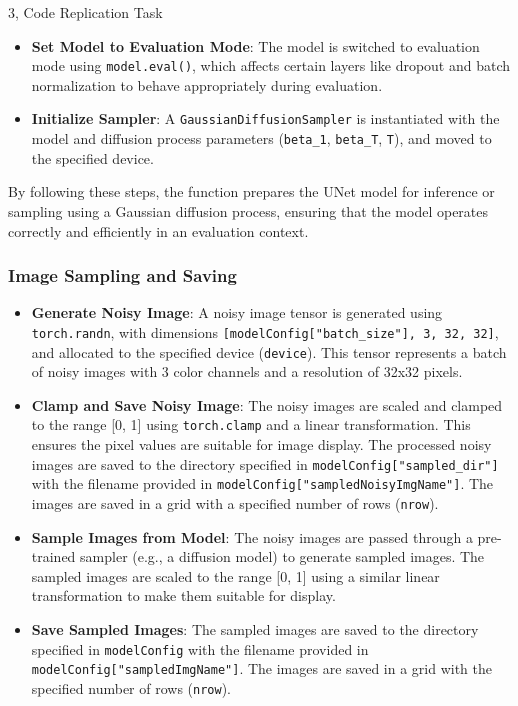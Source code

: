 \documentclass[10pt,a4paper]{article}
\begin{document}
\begin{task}{3, Code Replication Task}
\begin{itemize}
    \item \textbf{Set Model to Evaluation Mode}: The model is switched to evaluation mode using \texttt{model.eval()}, which affects certain layers like dropout and batch normalization to behave appropriately during evaluation.
    
    \item \textbf{Initialize Sampler}: A \texttt{GaussianDiffusionSampler} is instantiated with the model and diffusion process parameters (\texttt{beta\_1}, \texttt{beta\_T}, \texttt{T}), and moved to the specified device.
\end{itemize}

By following these steps, the function prepares the UNet model for inference or sampling using a Gaussian diffusion process, ensuring that the model operates correctly and efficiently in an evaluation context.
\subsubsection{Image Sampling and Saving}


\begin{itemize}
    \item \textbf{Generate Noisy Image}: 
    A noisy image tensor is generated using \texttt{torch.randn}, with dimensions \texttt{[modelConfig["batch\_size"], 3, 32, 32]}, and allocated to the specified device (\texttt{device}). This tensor represents a batch of noisy images with 3 color channels and a resolution of 32x32 pixels.

    \item \textbf{Clamp and Save Noisy Image}: 
    The noisy images are scaled and clamped to the range [0, 1] using \texttt{torch.clamp} and a linear transformation. This ensures the pixel values are suitable for image display. The processed noisy images are saved to the directory specified in \texttt{modelConfig["sampled\_dir"]} with the filename provided in \texttt{modelConfig["sampledNoisyImgName"]}. The images are saved in a grid with a specified number of rows (\texttt{nrow}).

    \item \textbf{Sample Images from Model}: 
    The noisy images are passed through a pre-trained sampler (e.g., a diffusion model) to generate sampled images. The sampled images are scaled to the range [0, 1] using a similar linear transformation to make them suitable for display.

    \item \textbf{Save Sampled Images}: 
    The sampled images are saved to the directory specified in \texttt{modelConfig} with the filename provided in \texttt{modelConfig["sampledImgName"]}. The images are saved in a grid with the specified number of rows (\texttt{nrow}).
\end{itemize}

\end{task}
\end{document}
